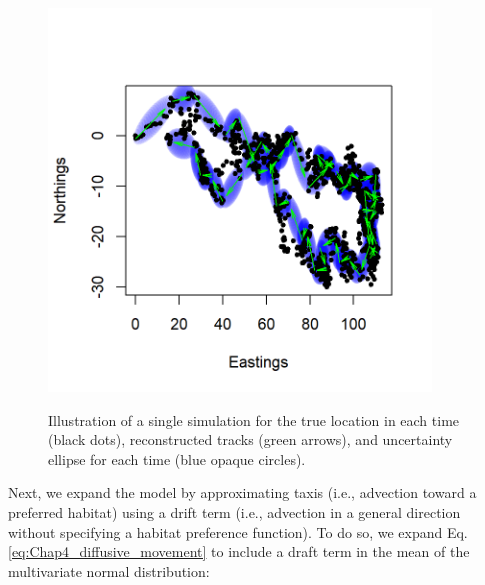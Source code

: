\begin{figure}[!ht]
    \caption[Reconstructed track using bivariate autoregressive state-space model]{Illustration of a single simulation for the true location in each time (black dots), reconstructed tracks (green arrows), and uncertainty ellipse for each time (blue opaque circles).}
    \centering
    \includegraphics[width=4in]{Chap_4/fitted_diffusion.png}
    \label{fig:Chap4_fitted_diffusion}
\end{figure}

Next, we expand the model by approximating taxis (i.e., advection toward a preferred habitat) using a drift term (i.e., advection in a general direction without specifying a habitat preference function).  To do so, we expand Eq. \ref{eq:Chap4_diffusive_movement} to include a draft term in the mean of the multivariate normal distribution:

